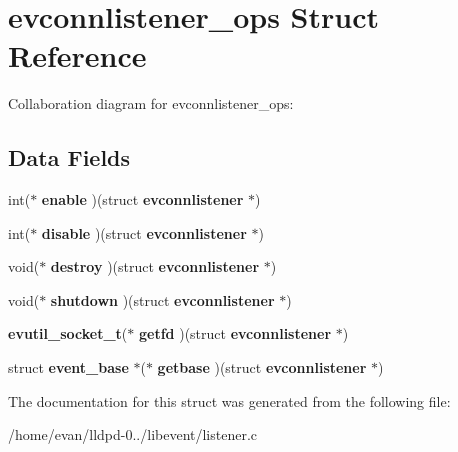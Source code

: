 \section{evconnlistener\-\_\-ops \-Struct \-Reference}
\label{structevconnlistener__ops}


\-Collaboration diagram for evconnlistener\-\_\-ops\-:
\subsection*{\-Data \-Fields}
\begin{DoxyCompactItemize}
\item 
int($\ast$ {\bfseries enable} )(struct {\bf evconnlistener} $\ast$)\label{structevconnlistener__ops_ae8ce8fdb61f7c31f0b62d3380ef5a01c}

\item 
int($\ast$ {\bfseries disable} )(struct {\bf evconnlistener} $\ast$)\label{structevconnlistener__ops_a449edd238ee921282cdb0b679122fc65}

\item 
void($\ast$ {\bfseries destroy} )(struct {\bf evconnlistener} $\ast$)\label{structevconnlistener__ops_a4deeea2e37095d1a96e9b14c13b264db}

\item 
void($\ast$ {\bfseries shutdown} )(struct {\bf evconnlistener} $\ast$)\label{structevconnlistener__ops_a52522389fdbbfc9aae5641d6f4659182}

\item 
{\bf evutil\-\_\-socket\-\_\-t}($\ast$ {\bfseries getfd} )(struct {\bf evconnlistener} $\ast$)\label{structevconnlistener__ops_a536964453bb9841610e30400440ff283}

\item 
struct {\bf event\-\_\-base} $\ast$($\ast$ {\bfseries getbase} )(struct {\bf evconnlistener} $\ast$)\label{structevconnlistener__ops_a705f35b0484e5da23c2627de81748185}

\end{DoxyCompactItemize}


\-The documentation for this struct was generated from the following file\-:\begin{DoxyCompactItemize}
\item 
/home/evan/lldpd-\/0../libevent/listener.\-c\end{DoxyCompactItemize}
